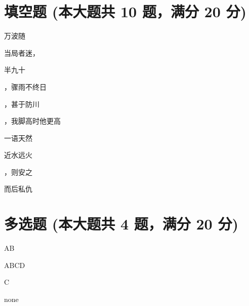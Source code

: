 \documentclass[12pt, a4paper, addpoints, answers]{exam}
\begin{document}
\hspace{5cm}

\section{\normalsize{填空题 (本大题共 10 题，满分 20 分)}}
\hspace{1.5cm}
\begin{multicols}{2}
\begin{questions}
\question[2] \fillin[一波才动] 万波随

\question[2] 当局者迷，\fillin[旁观者清] 

\question[2] \fillin[行百里者] 半九十

\question[2] \fillin[飘风不终朝] ，骤雨不终日

\question[2] \fillin[防民之口] ，甚于防川

\question[2] \fillin[一步一陟一回顾] ，我脚高时他更高

\question[2] 一语天然\fillin[万古新] 

\question[2] 近水\fillin[救不得] 远火

\question[2] \fillin[既来之] ，则安之

\question[2] \fillin[先国家之急] 而后私仇

\end{questions}
\end{multicols}

\hspace{5cm}

\section{\normalsize{多选题 (本大题共 4 题，满分 20 分)}}
\hspace{1.5cm}

\begin{questions}
\question[5] AB

\begin{oneparcheckboxes}
\end{oneparcheckboxes}

\question[5] ABCD

\begin{oneparcheckboxes}
\end{oneparcheckboxes}

\question[5] C

\begin{oneparcheckboxes}
\end{oneparcheckboxes}

\question[5] none

\begin{oneparcheckboxes}
\end{oneparcheckboxes}

\end{questions}
\end{document}
